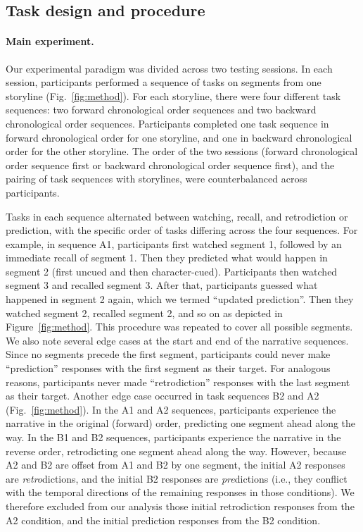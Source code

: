 \documentclass[10pt]{article}
\begin{document}
\subsection*{Task design and procedure}

\paragraph{Main experiment.}
Our experimental paradigm was divided across two testing sessions. In each
session, participants performed a sequence of tasks on segments from one
storyline (Fig.~\ref{fig:method}). For each storyline, there were four
different task sequences: two forward chronological order sequences and two
backward chronological order sequences. Participants completed one task
sequence in forward chronological order for one storyline, and one in backward
chronological order for the other storyline. The order of the two sessions
(forward chronological order sequence first or backward chronological order
sequence first), and the pairing of task sequences with storylines, were
counterbalanced across participants.

Tasks in each sequence alternated between watching, recall, and retrodiction or
prediction, with the specific order of tasks differing across the four
sequences. For example, in sequence A1, participants first watched segment 1,
followed by an immediate recall of segment 1. Then they predicted what would
happen in segment 2 (first uncued and then character-cued). Participants then
watched segment 3 and recalled segment 3. After that, participants guessed what
happened in segment 2 again, which we termed ``updated prediction''. Then they
watched segment 2, recalled segment 2, and so on as depicted in
Figure~\ref{fig:method}. This procedure was repeated to cover all possible
segments. We also note several edge cases at the start and end of the narrative
sequences. Since no segments precede the first segment, participants could
never make ``prediction'' responses with the first segment as their target. For
analogous reasons, participants never made ``retrodiction'' responses with the
last segment as their target. Another edge case occurred in task sequences B2
and A2 (Fig.~\ref{fig:method}). In the A1 and A2 sequences, participants
experience the narrative in the original (forward) order, predicting one
segment ahead along the way. In the B1 and B2 sequences, participants
experience the narrative in the reverse order, retrodicting one segment ahead
along the way. However, because A2 and B2 are offset from A1 and B2 by one
segment, the initial A2 responses are \textit{retro}dictions, and the initial
B2 responses are \textit{pre}dictions (i.e., they conflict with the temporal
directions of the remaining responses in those conditions). We therefore
excluded from our analysis those initial retrodiction responses from the A2
condition, and the initial prediction responses from the B2 condition.
\end{document}
